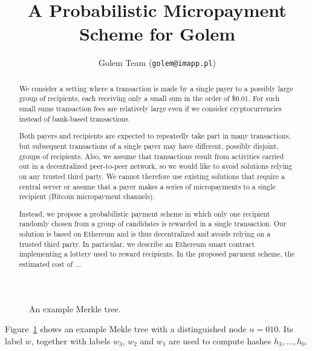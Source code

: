 \documentclass[a4paper]{article}
\title{A Probabilistic Micropayment Scheme for Golem}
\author{Golem Team (\texttt{golem@imapp.pl})}
\begin{document}
\maketitle

\begin{abstract}
  We consider a setting where a transaction is made by a single payer
  to a possibly large group of recipients, each receiving only a small
  sum in the order of \$$0.01$. For such small sums transaction fees are
  relatively large even if we consider cryptocurrencies instead of
  bank-based transactions.

  Both payers and recipients are expected to repeatedly take part in
  many transactions, but subsequent transactions of a single payer may
  have different, possibly disjoint, groups of recipients. Also, we
  assume that transactions result from activities carried out in a
  decentralized peer-to-peer network, so we would like to avoid
  solutions relying on any trusted third party. We cannot therefore use
  existing solutions that require a central server or assume that a
  payer makes a series of micropayments to a single recipient (Bitcoin
  micropayment channels).

  Instead, we propose a probabilistic payment scheme in which only one
  recipient randomly chosen from a group of candidates is rewarded in
  a single transaction. Our solution is based on Ethereum and is thus
  decentralized and avoids relying on a trusted third party. In
  particular, we describe an Ethereum smart contract implementing a
  lottery used to reward recipients. In the proposed payment scheme,
  the estimated cost of ...
\end{abstract}

\begin{figure}
  
  \caption{An example Merkle tree.}
  \label{fig:merkle}
\end{figure}

Figure~\ref{fig:merkle} shows an example Mekle tree with a distinguished node $n = 010$. Its label $w$, together with labels $w_3$, $w_2$ and $w_1$ are used to compute hashes $h_3, \ldots, h_0$.
\end{document}
